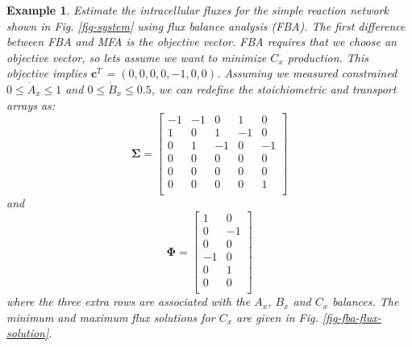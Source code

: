 \documentclass[11pt]{article}
\newtheorem{example}{Example}[section]
\theoremstyle{definition}
\begin{document}
\begin{example}
	Estimate the intracellular fluxes for the simple reaction network shown in Fig. \eqref{fig-system} using flux balance analysis (FBA).
	The first difference between FBA and MFA is the objective vector. FBA requires that we choose an objective vector, so lets assume we want to
	minimize $C_{x}$ production. This objective implies $\mathbf{c}^{T}$ = $\left(0,0,0,0,-1,0,0\right)$.
	Assuming we measured constrained $0\leq\dot{A}_{x}\leq{1}$ and $0\leq\dot{B}_{x}\leq{0.5}$,  we can redefine the stoichiometric and transport arrays as:
	\begin{equation}
	\mathbf{\Sigma} =
	\begin{bmatrix}
		-1 & -1 & 0 & 1 & 0 \\
		1 & 0 & 1 & -1 & 0 \\
		0 & 1 & -1 & 0 & -1 \\
		0 & 0 & 0 & 0 & 0 \\
		0 & 0 & 0 & 0 & 0 \\
		0 & 0 & 0 & 0 & 1 \\
	\end{bmatrix}
	\end{equation} and
	\begin{equation}
		\mathbf{\Phi} =
		\begin{bmatrix}
			1 & 0 \\
			0 & -1 \\
			0 & 0 \\
			-1 & 0 \\
			0 & 1 \\
			0 & 0 \\
		\end{bmatrix}
	\end{equation}where the three extra rows are associated with the $A_{x}$, $B_{x}$ and $C_{x}$ balances.
	The minimum and maximum flux solutions for $C_{x}$ are given in Fig. \eqref{fig-fba-flux-solution}.

	\begin{figure*}[h!]\centering
	\caption{Example flux solution  $0\leq\dot{A}_{x}\leq{1}$ and $0\leq\dot{B}_{x}\leq{0.5}$ for minimizing or maximizing $C_{x}$.}\label{fig-fba-flux-solution}
	\end{figure*}

\end{example}



\end{document}
